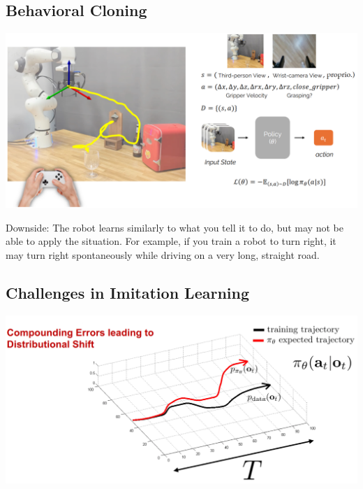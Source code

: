 \documentclass[10pt]{article}
\begin{document}
\subsection*{Behavioral Cloning}
\begin{center}
    \includegraphics*[width=\textwidth]{L2_8.png}
\end{center}
Downside: The robot learns similarly to what you tell it to do, but may not be able to apply the situation.  For example, if you train a robot to turn right, it may turn right spontaneously while driving on a very long, straight road.

\subsection*{Challenges in Imitation Learning}
\begin{center}
    \includegraphics*[width=\textwidth]{L2_9.png}
\end{center}
\end{document}
